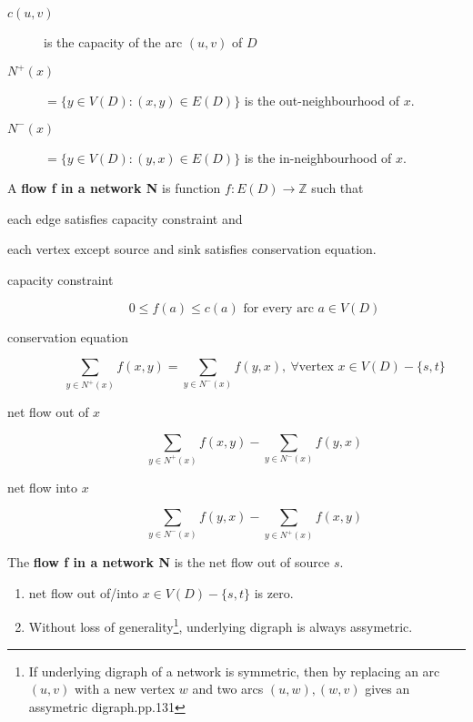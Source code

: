 \begin{description}
	\item[$c(u,v)$] is the capacity of the arc $(u,v)$ of $D$
	\item[$N^+(x)$] $= \{ y \in V(D) : (x,y) \in E(D)\}$ is the out-neighbourhood of $x$.
	\item[$N^-(x)$] $= \{ y \in V(D) : (y,x) \in E(D)\}$ is the in-neighbourhood of $x$.
\end{description}

\begin{definition}
	A \textbf{flow f in a network N} is function $f : E(D) \to \mathbb{Z}$ such that
	\begin{enumerate*}
		\item each edge satisfies capacity constraint and
		\item each vertex except source and sink satisfies conservation equation.
	\end{enumerate*}
\end{definition}

\begin{description}
	\item[capacity constraint] 
		\begin{equation}
		0 \le f(a) \le c(a) \text{ for every arc }a \in V(D)
		\end{equation}
	\item[conservation equation] 
		\begin{equation}
			\sum_{y \in N^+(x)} f(x,y) = \sum_{y \in N^-(x)} f(y,x),\ \forall \text{vertex } x \in V(D)-\{s,t\}
		\label{equ:conservation}
		\end{equation}
	\item[net flow out of $x$]
		\[ \sum_{y \in N^+(x)} f(x,y) - \sum_{y \in N^-(x)} f(y,x) \]
	\item[net flow into $x$]
		\[ \sum_{y \in N^-(x)} f(y,x) - \sum_{y \in N^+(x)} f(x,y) \]
\end{description}

\begin{definition}
	The \textbf{flow f in a network N} is the net flow out of source $s$.
\end{definition}

\begin{remark}
	\begin{enumerate}
		\item net flow out of/into $x \in V(D)-\{s,t\}$ is zero.
		\item Without loss of generality\footnote{If underlying digraph of a network is symmetric, then by replacing an arc $(u,v)$ with a new vertex $w$ and two arcs $(u,w),(w,v)$ gives an assymetric digraph.\cite{chartrand}pp.131}, underlying digraph is always assymetric.
	\end{enumerate}
\end{remark}

